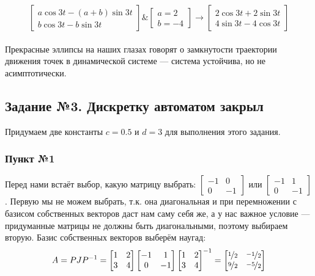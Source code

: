 \documentclass[a3paper,14pt]{extarticle}
\begin{document}
$$\begin{bmatrix}
    a\cos{3t}-(a+b)\sin{3t} \\ b\cos{3t}-b\sin{3t}
\end{bmatrix} \& \begin{bmatrix}
    a=2 \\ b=-4
\end{bmatrix} \rightarrow \begin{bmatrix}
    2\cos{3t}+2\sin{3t} \\ 4\sin{3t}-4\cos{3t}
\end{bmatrix}$$\,\\[0em]
Прекрасные эллипсы на наших глазах говорят о замкнутости траектории движения точек в динамической системе --- система устойчива, но не асимптотически.
\subsection*{\centering Задание №3. Дискретку автоматом закрыл}
Придумаем две константы $c = 0.5$ и $d = 3$ для выполнения этого задания.
\subsubsection*{Пункт №1}
Перед нами встаёт выбор, какую матрицу выбрать: $\left[\begin{smallmatrix}
    -1 & 0 \\ 0 & -1
\end{smallmatrix}\right]$ или $\left[\begin{smallmatrix}
    -1 & 1 \\ 0 & -1
\end{smallmatrix}\right]$. Первую мы не можем выбрать, т.к. она диагональная и при перемножении с базисом собственных векторов даст нам саму себя же, а у нас важное условие --- придуманные матрицы не должны быть диагональными, поэтому выбираем вторую. Базис собственных векторов выберём наугад:
$$A = PJP^{-1} = \begin{bmatrix}
    1 & 2 \\ 3 & 4
\end{bmatrix}\begin{bmatrix}
    -1 & 1 \\ 0 & -1
\end{bmatrix}\begin{bmatrix}
    1 & 2 \\ 3 & 4
\end{bmatrix}^{-1} = \begin{bmatrix}
    \nicefrac{1}{2} & \nicefrac{-1}{2} \\
    \nicefrac{9}{2} & \nicefrac{-5}{2}
\end{bmatrix}$$
\end{document}
